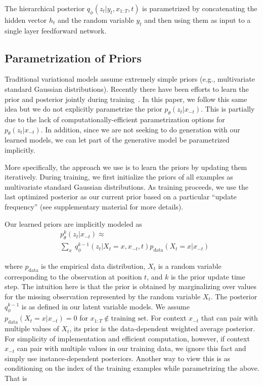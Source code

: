 \documentclass[11pt,a4paper]{article}
\begin{document}
The hierarchical posterior $q_{\phi}(z_t |y_t,x_{1:T},t)$ is parametrized by concatenating the hidden vector $h_t$ and the random variable $y_t$ and then using them as input to a single layer feedforward network.

\subsection{Parametrization of Priors}
\label{prior}

Traditional variational models assume extremely simple priors (e.g., multivariate standard Gaussian distributions). Recently there have been efforts to learn the prior and posterior jointly during training~\cite{fraccaro2016sequential,serban2017piecewise,tomczak2017vae}.
In this paper, we follow this same idea  but we do not explicitly parametrize the prior  $p_\theta(z_t\vert x_{-t})$. This is partially due to the lack of computationally-efficient parametrization options for $p_\theta(z_t\vert x_{-t})$. In addition, since we are not seeking to do generation with our learned models, we can let part of the generative model be parametrized implicitly.

More specifically, the approach we use is to learn the priors by updating them iteratively. During training, we first initialize the priors of all examples as multivariate standard Gaussian distributions. As  training proceeds, we use the last optimized posterior as our current prior based on a particular ``update frequency'' (see supplementary material for more details).

Our learned priors are implicitly modeled as
\begin{equation}
\begin{aligned}
   &p^k_\theta(z_t\vert x_{-t}) \approx \\
   &\sum_{x}~q^{k-1}_\phi(z_t\vert X_t = x,x_{-t}, t)p_\text{data}(X_t = x \vert x_{-t})
\end{aligned}
\label{eqn:prior}
\end{equation}
\noindent

where $p_\text{data}$ is the empirical data distribution, $X_t$ is a random variable corresponding to the observation at position $t$, and $k$ is the prior update time step.
The intuition here is that the prior is obtained by marginalizing over values for the missing observation represented by the random variable $X_t$. The posterior $q^{k-1}_\phi$ is as defined in our latent variable models.
We assume $p_\text{data}(X_t=x\vert x_{-t})=0$ for $x_{1:T}\notin\text{training set}$.
For context $x_{-t}$ that can pair with multiple values of $X_t$, its prior is the data-dependent weighted average posterior.
For simplicity of implementation and efficient computation, however, if context $x_{-t}$ can pair with multiple values in our training data, we ignore this fact and simply use instance-dependent posteriors.
Another way to view this is as conditioning on the index of the training examples while parametrizing the above. That is
\end{document}
